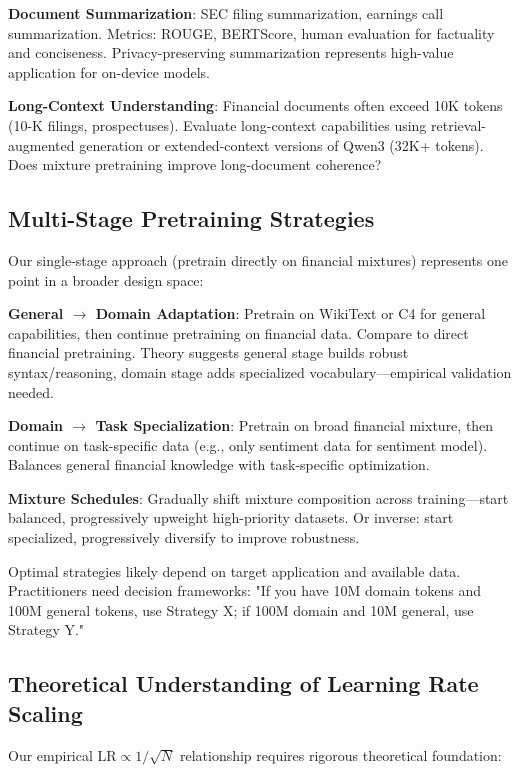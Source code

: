 \textbf{Document Summarization}: SEC filing summarization, earnings call summarization. Metrics: ROUGE, BERTScore, human evaluation for factuality and conciseness. Privacy-preserving summarization represents high-value application for on-device models.

\textbf{Long-Context Understanding}: Financial documents often exceed 10K tokens (10-K filings, prospectuses). Evaluate long-context capabilities using retrieval-augmented generation or extended-context versions of Qwen3 (32K+ tokens). Does mixture pretraining improve long-document coherence?

\subsection{Multi-Stage Pretraining Strategies}

Our single-stage approach (pretrain directly on financial mixtures) represents one point in a broader design space:

\textbf{General $\rightarrow$ Domain Adaptation}: Pretrain on WikiText or C4 for general capabilities, then continue pretraining on financial data. Compare to direct financial pretraining. Theory suggests general stage builds robust syntax/reasoning, domain stage adds specialized vocabulary—empirical validation needed.

\textbf{Domain $\rightarrow$ Task Specialization}: Pretrain on broad financial mixture, then continue on task-specific data (e.g., only sentiment data for sentiment model). Balances general financial knowledge with task-specific optimization.

\textbf{Mixture Schedules}: Gradually shift mixture composition across training—start balanced, progressively upweight high-priority datasets. Or inverse: start specialized, progressively diversify to improve robustness.

Optimal strategies likely depend on target application and available data. Practitioners need decision frameworks: "If you have 10M domain tokens and 100M general tokens, use Strategy X; if 100M domain and 10M general, use Strategy Y."

\subsection{Theoretical Understanding of Learning Rate Scaling}

Our empirical $\text{LR} \propto 1/\sqrt{N}$ relationship requires rigorous theoretical foundation:

